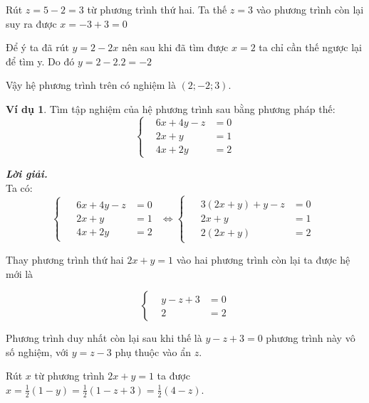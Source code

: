 \documentclass[12pt,a4paper,oneside]{book}
\theoremstyle{theorem}
\theoremstyle{definition}
\newtheorem{vd}[theorem2]{Ví dụ}
\begin{document}
Rút $z=5-2=3$ từ phương trình thứ hai. Ta thế $z=3$ vào phương trình còn lại suy ra được $x=-3+3=0$

Để ý ta đã rút $y=2-2x$ nên sau khi đã tìm được $x=2$ ta chỉ cần thế ngược lại để tìm y. Do đó $y=2-2.2=-2$

Vậy hệ phương trình trên có nghiệm là $(2;-2;3)$.

\begin{vd}
        Tìm tập nghiệm của hệ phương trình sau bằng phương pháp thế:
    \[
\left\{
\begin{aligned}
&6x+4y-z &= 0 \\
&2x+y&= 1 \\
&4x+2y &= 2
\end{aligned}
\right.
\]
       \end{vd}
     \textbf{\textit{Lời giải.}}\\
Ta có: \[
\begin{cases}
\begin{aligned}
&6x+4y-z &= 0 \\
&2x+y&= 1 \\
&4x+2y &= 2
\end{aligned}
\end{cases}
\Leftrightarrow
\begin{cases}
\begin{aligned}
&3(2x+y)+y-z &= 0 \\
&2x+y&= 1 \\
&2(2x+y) &= 2
\end{aligned}
\end{cases} \]

Thay phương trình thứ hai $2x+y= 1$ vào hai phương trình còn lại ta được hệ mới là

\[
\left\{
\begin{aligned}
&y-z +3&= 0 \\
&2 &= 2
\end{aligned}
\right.
\] 

Phương trình duy nhất còn lại sau khi thế là $y-z+3=0$ phương trình này vô số nghiệm, với $y=z-3$ phụ thuộc vào ẩn $z$.

Rút $x$ từ phương trình $2x+y=1$ ta được $x=\frac{1}{2}(1-y)=\frac{1}{2}(1-z+3)= \frac{1}{2}(4-z)$.
\end{document}
